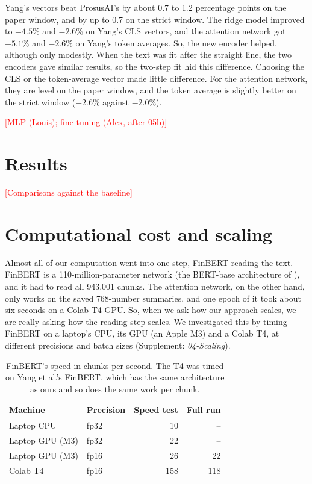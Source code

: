 \documentclass[11pt,a4paper]{article}
\newcommand{\supp}[1]{(Supplement: \textit{#1})}
\newcommand{\placeholder}[1]{\textcolor{red}{[#1]}}
\begin{document}
Yang's vectors beat ProsusAI's by about 0.7 to 1.2 percentage points on the paper window, and by up to 0.7 on the strict window. The ridge model improved to $-4.5\%$ and $-2.6\%$ on Yang's CLS vectors, and the attention network got $-5.1\%$ and $-2.6\%$ on Yang's token averages. So, the new encoder helped, although only modestly. When the text was fit after the straight line, the two encoders gave similar results, so the two-step fit hid this difference. Choosing the CLS or the token-average vector made little difference. For the attention network, they are level on the paper window, and the token average is slightly better on the strict window ($-2.6\%$ against $-2.0\%$).

\placeholder{MLP (Louis); fine-tuning (Alex, after 05b)}

\section{Results}\label{sec:results}
\placeholder{Comparisons against the baseline}

\section{Computational cost and scaling}\label{sec:scaling}

Almost all of our computation went into one step, FinBERT reading the text. FinBERT is a 110-million-parameter network (the BERT-base architecture of \citet{devlin2019}), and it had to read all 943,001 chunks. The attention network, on the other hand, only works on the saved 768-number summaries, and one epoch of it took about six seconds on a Colab T4 GPU. So, when we ask how our approach scales, we are really asking how the reading step scales. We investigated this by timing FinBERT on a laptop's CPU, its GPU (an Apple M3) and a Colab T4, at different precisions and batch sizes \supp{04-Scaling}.

\begin{table}[ht]
  \centering
  \small
  \caption{FinBERT's speed in chunks per second. The T4 was timed on Yang et al.'s FinBERT, which has the same architecture as ours and so does the same work per chunk.}\label{tab:speed}
  \begin{tabular}{@{}llrr@{}}
    \toprule
    Machine & Precision & Speed test & Full run \\
    \midrule
    Laptop CPU & fp32 & 10 & -- \\
    Laptop GPU (M3) & fp32 & 22 & -- \\
    Laptop GPU (M3) & fp16 & 26 & 22 \\
    Colab T4 & fp16 & 158 & 118 \\
    \bottomrule
  \end{tabular}
\end{table}
\end{document}
